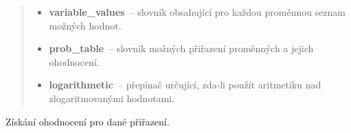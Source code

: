 \begin{fulllineitems}
\begin{fulllineitems}
\begin{quote}
\begin{description}
\begin{itemize}
\item {} 
\textbf{variable\_values}~-- slovník obsahující pro každou proměnnou seznam možných hodnot.

\item {} 
\textbf{prob\_table}~-- slovník možných přiřazení proměnných a jejich ohodnocení.

\item {} 
\textbf{logarithmetic}~-- přepínač určující, zda-li použít aritmetiku nad zlogaritmovanými hodnotami.

\end{itemize}

\end{description}\end{quote}

\end{fulllineitems}


\begin{fulllineitems}
\label{alex.infer:alex.infer.factor.Factor.__getitem__}
Získání ohodnocení pro dané přiřazení.


\end{fulllineitems}
\end{fulllineitems}
